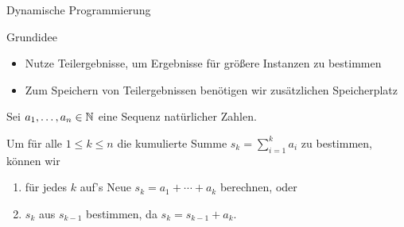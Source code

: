 
\begin{frame}{Dynamische Programmierung}
\begin{block}{Grundidee}
    \begin{itemize}
        \item Nutze \alert{Teilergebnisse}, um Ergebnisse f\"ur gr\"o{\ss}ere Instanzen zu bestimmen
        \item Zum Speichern von Teilergebnissen ben\"otigen wir \alert{zus\"atzlichen Speicherplatz}
    \end{itemize}
\end{block}

\begin{example}
Sei $a_1, \dots, a_n \in \mathbb{N}$ eine Sequenz nat\"urlicher Zahlen.

Um f\"ur alle $1 \leq k \leq n$ die \alert{kumulierte Summe} $s_k = \sum_{i=1}^{k} a_i$ zu bestimmen, k\"onnen wir
\begin{enumerate}
    \item f\"ur jedes $k$ auf's Neue $s_k = a_1 + \cdots + a_{k}$ berechnen, oder
    \item $s_k$ aus $s_{k-1}$ bestimmen, da $s_k = s_{k-1} + a_k$.
\end{enumerate}
\end{example}
\end{frame}

